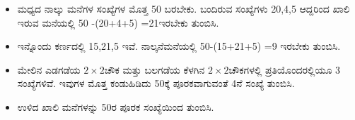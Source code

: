 \begin{itemize}
	\item ಮಧ್ಯದ ನಾಲ್ಕು ಮನೆಗಳ ಸಂಖ್ಯೆಗಳ ಮೊತ್ತ 50 ಬರಬೇಕು. ಬಂದಿರುವ ಸಂಖ್ಯೆಗಳು 20,4,5 ಆದ್ದರಿಂದ ಖಾಲಿ ಇರುವ ಮನೆಯಲ್ಲಿ 50 -(20+4+5) =21ಇರಬೇಕು ತುಂಬಿಸಿ.
	\item ಇನ್ನೊಂದು ಕರ್ಣದಲ್ಲಿ 15,21,5 ಇವೆ. ನಾಲ್ಕನೆಮನೆಯಲ್ಲಿ 50-(15+21+5) =9 ಇರಬೇಕು ತುಂಬಿಸಿ.
	\item ಮೇಲಿನ ಎಡಗಡೆಯ $2 \times 2$ಚೌಕ ಮತ್ತು ಬಲಗಡೆಯ ಕೆಳಗಿನ $2 \times 2$ಚೌಕಗಳಲ್ಲಿ ಪ್ರತಿಯೊಂದರಲ್ಲಿಯೂ 3 ಸಂಖ್ಯೆಗಳಿವೆ. ಇವುಗಳ ಮೊತ್ತ ಕಂಡುಹಿಡಿದು 50ಕ್ಕೆ ಪೂರಕವಾಗುವಂತೆ 4ನೆ ಸಂಖ್ಯೆ ತುಂಬಿಸಿ.
	\item ಉಳಿದ ಖಾಲಿ ಮನೆಗಳನ್ನು 50ರ ಪೂರಕ ಸಂಖ್ಯೆಯಿಂದ ತುಂಬಿಸಿ.
\end{itemize}

